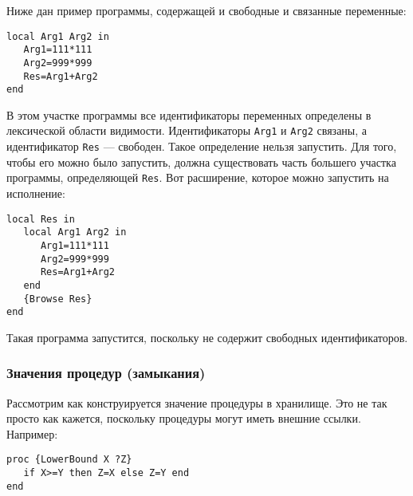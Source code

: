 Ниже дан пример программы, содержащей и свободные и связанные переменные:

\begin{table}
\end{table}

\begin{lstlisting}
local Arg1 Arg2 in
   Arg1=111*111
   Arg2=999*999
   Res=Arg1+Arg2
end
\end{lstlisting}

В этом участке программы все идентификаторы переменных определены в лексической области видимости. Идентификаторы \lstinline|Arg1| и \lstinline|Arg2| связаны, а идентификатор \lstinline|Res| --- свободен. Такое определение нельзя запустить. Для того, чтобы его можно было запустить, должна существовать часть большего участка программы, определяющей \lstinline|Res|. Вот расширение, которое можно запустить на исполнение:

\begin{lstlisting}
local Res in
   local Arg1 Arg2 in
      Arg1=111*111
      Arg2=999*999
      Res=Arg1+Arg2
   end
   {Browse Res}
end
\end{lstlisting}

Такая программа запустится, поскольку не содержит свободных идентификаторов.

\subsubsection{Значения процедур (замыкания)}

Рассмотрим как конструируется значение процедуры в хранилище. Это не так просто как кажется, поскольку процедуры могут иметь внешние ссылки. Например:

\begin{lstlisting}
proc {LowerBound X ?Z}
   if X>=Y then Z=X else Z=Y end
end
\end{lstlisting}

